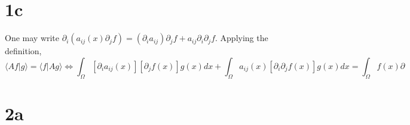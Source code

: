 \documentclass{article}
\begin{document}
\section*{1c}
One may write $\partial_{i}(a_{ij}(x)\partial_{j}f)=(\partial_{i}a_{ij})\partial_{j}f+a_{ij}\partial_{i}\partial_{j}f$.
Applying the definition,
\[
  \langle Af|g \rangle=\langle f|Ag \rangle
  \Leftrightarrow \int_{\Omega}[\partial_{i}a_{ij}(x)][\partial_{j}f(x)]g(x)dx+\int_{\Omega}a_{ij}(x)[\partial_{i}\partial_{j}f(x)]g(x)dx
  =\int_{\Omega}f(x)\partial
\]

\section*{2a}
\end{document}
